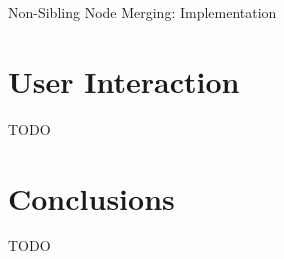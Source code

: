 \documentclass[10pt,twocolumn,twoside]{IEEEtran}
\begin{document}
\begin{stulisting}[p]
\caption{Non-Sibling Node Merging: Implementation}
\label{code:ipfs-forest-mergenonsiblingnodes}

\end{stulisting}

\section{User Interaction}
\label{sec:ui}

TODO

\section{Conclusions}
\label{sec:conclusions}

TODO

\clearpage



\end{document}
